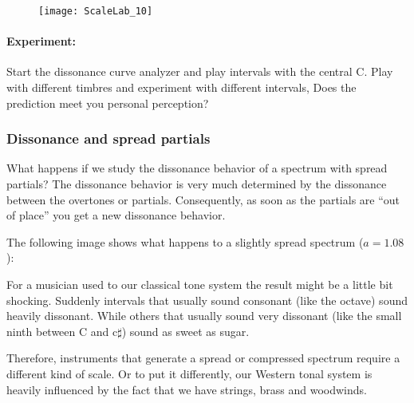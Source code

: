 \begin{figure}[h]
\centering
\texttt{[image: ScaleLab\_10]}
\end{figure}

\paragraph{Experiment:}
Start the dissonance curve analyzer and play intervals with the central C. Play with different timbres and experiment with different intervals, Does the prediction meet you personal perception?


\subsubsection{Dissonance and spread partials}
What happens if we study the dissonance behavior of a spectrum with spread partials? The dissonance behavior is very much determined by the dissonance between the overtones or partials. Consequently, as soon as the partials are ``out of place'' you get a new dissonance behavior.

The following image shows what happens to a slightly spread spectrum ($a=1.08$):


\begin{figure}[h]
\centering
{}
\end{figure}

For a musician used to our classical tone system the result might be a little bit shocking. Suddenly intervals that usually sound consonant (like the octave) sound heavily dissonant. While others that usually sound very dissonant (like the small ninth between C and c$\sharp$) sound as sweet as sugar.

Therefore, instruments that generate a spread or compressed spectrum require a different kind of scale. Or to put it differently, our Western tonal system is heavily influenced by the fact that we have strings, brass and woodwinds.

